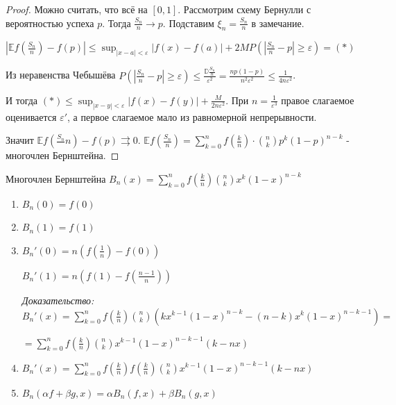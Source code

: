 \begin{proof}
    Можно считать, что всё на $[0, 1]$. Рассмотрим схему Бернулли с вероятностью успеха $p$.
    Тогда $\frac{S_n}{n} \rightarrow p$. Подставим $\xi_n = \frac{S_n}{n}$ в замечание.

    $|\mathbb{E} f(\frac{S_n}{n}) - f(p)| \leqslant \sup_{|x - a| < \varepsilon} |f(x) - f(a)| + 2M P(|\frac{S_n}{n} - p| \geqslant \varepsilon) = (*)$

    Из неравенства Чебышёва $P(|\frac{S_n}{n} - p| \geqslant \varepsilon) \leqslant \frac{\mathbb{D}\frac{S_n}{n}}{\varepsilon^2} = \frac{np(1 - p)}{n^2\varepsilon^2} \leqslant \frac{1}{4n\varepsilon^2}$.

    И тогда $(*) \leqslant \sup_{|x - y| < \varepsilon} |f(x) - f(y)| + \frac{M}{2n\varepsilon^2}$. При $n = \frac{1}{\varepsilon^3}$ правое слагаемое оценивается $\varepsilon'$, а первое
    слагаемое мало из равномерной непрерывности.

    Значит $\mathbb{E} f(\frac{S_n}{}n) - f(p) \rightrightarrows 0$. $\mathbb{E} f(\frac{S_n}{n}) = \sum_{k = 0}^n f(\frac{k}{n}) \cdot \binom{n}{k} p^k (1 - p)^{n - k}$ - многочлен Бернштейна.
\end{proof}

\begin{definition}
    Многочлен Бернштейна $B_n(x) = \sum_{k = 0}^n f(\frac{k}{n}) \binom{n}{k} x^k (1-x)^{n - k}$
\end{definition}

\begin{consequence}
    \begin{enumerate}
        \item {
            $B_n(0) = f(0)$
        }
        \item {
            $B_n(1) = f(1)$
        }
        \item {
            $B_n'(0) = n(f(\frac{1}{n}) - f(0))$

            $B_n'(1) = n(f(1) - f(\frac{n - 1}{n}))$

            \textit{Доказательство: } $B_n'(x) = \sum_{k = 0}^n f(\frac{k}{n})\binom{n}{k} (kx^{k - 1}(1 - x)^{n - k} - (n - k)x^k(1-x)^{n - k - 1}) = $

            $= \sum_{k = 0}^n f(\frac{k}{n}) \binom{n}{k} x^{k-1}(1-x)^{n - k - 1}(k - nx)$
        }
        \item {
            $B_n'(x) = \sum_{k = 0}^n f(\frac{k}{n}) f(\frac{k}{n}) \binom{n}{k} x^{k-1}(1-x)^{n - k -1} (k - nx)$
        }
        \item {
            $B_n(\alpha f + \beta g, x) = \alpha B_n(f, x) + \beta B_n(g, x)$
        }
    \end{enumerate}
\end{consequence}

